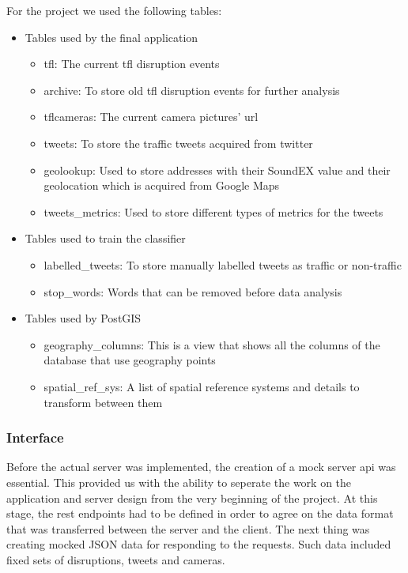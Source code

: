 For the project we used the following tables:
\begin{itemize}
\item Tables used by the final application
  \begin{itemize}
  \item tfl: The current tfl disruption events
  \item archive: To store old tfl disruption events for further analysis
  \item tflcameras: The current camera pictures' url
  \item tweets: To store the traffic tweets acquired from twitter
  \item geolookup: Used to store addresses with their SoundEX value and their geolocation which is acquired from Google Maps
  \item tweets\_metrics: Used to store different types of metrics for the tweets
  \end{itemize}
\item Tables used to train the classifier
  \begin{itemize}
  \item labelled\_tweets: To store manually labelled tweets as traffic or non-traffic
  \item stop\_words: Words that can be removed before data analysis
  \end{itemize}
\item Tables used by PostGIS
  \begin{itemize}
  \item geography\_columns: This is a view that shows all the columns of the database that use geography points
  \item spatial\_ref\_sys: A list of spatial reference systems and details to transform between them
  \end{itemize}
\end{itemize}

\subsubsection{Interface}

Before the actual server was implemented, the creation of a mock server api was essential. This 
provided us with the ability to seperate the work on the application and server design from the very 
beginning of the project. At this stage, the rest endpoints had to be defined in order to agree on the 
data format that was transferred between the server and the client. The next thing was creating mocked 
JSON data for responding to the requests. Such data included fixed sets of disruptions, tweets and 
cameras. 

